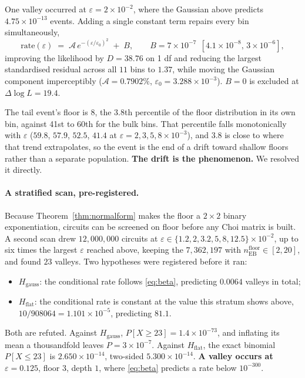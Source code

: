 \documentclass[11pt,a4paper]{article}
\theoremstyle{definition}
\theoremstyle{remark}
\newcommand{\floor}{n_{\mathrm{EB}}^{\mathrm{floor}}}
\begin{document}
One valley occurred at $\varepsilon = 2\times10^{-2}$, where the Gaussian above predicts $4.75\times10^{-13}$ events. Adding a single constant term repairs every bin simultaneously,
\begin{equation}\label{eq:tail}
  \text{rate}(\varepsilon) \;=\; \mathcal{A}\,e^{-(\varepsilon/\varepsilon_0)^2} \;+\; B, \qquad B = 7\times10^{-7}\ \ [4.1\times10^{-8},\, 3\times10^{-6}],
\end{equation}
improving the likelihood by $D = 38.76$ on 1 df and reducing the largest standardised residual across all $11$ bins to $1.37$, while moving the Gaussian component imperceptibly ($\mathcal{A} = 0.7902\%$, $\varepsilon_0 = 3.288\times10^{-3}$). $B = 0$ is excluded at $\Delta\log L = 19.4$.

The tail event's floor is $8$, the $3.8$th percentile of the floor distribution in its own bin, against 41st to 60th for the bulk bins. That percentile falls monotonically with $\varepsilon$ ($59.8$, $57.9$, $52.5$, $41.4$ at $\varepsilon = 2, 3, 5, 8 \times10^{-3}$), and $3.8$ is close to where that trend extrapolates, so the event is the end of a drift toward shallow floors rather than a separate population. \textbf{The drift is the phenomenon.} We resolved it directly.

\paragraph{A stratified scan, pre-registered.} Because Theorem~\ref{thm:normalform} makes the floor a $2\times2$ binary exponentiation, circuits can be screened on floor before any Choi matrix is built. A second scan drew $12{,}000{,}000$ circuits at $\varepsilon \in \{1.2, 2, 3.2, 5, 8, 12.5\}\times10^{-2}$, up to six times the largest $\varepsilon$ reached above, keeping the $7{,}362{,}197$ with $\floor \in [2,20]$, and found $23$ valleys. Two hypotheses were registered before it ran:
\begin{itemize}\itemsep2pt
\item $H_{\mathrm{gauss}}$: the conditional rate follows \eqref{eq:beta}, predicting $0.0064$ valleys in total;
\item $H_{\mathrm{flat}}$: the conditional rate is constant at the value this stratum shows above, $10/908064 = 1.101\times10^{-5}$, predicting $81.1$.
\end{itemize}
Both are refuted. Against $H_{\mathrm{gauss}}$, $P[X \ge 23] = 1.4\times10^{-73}$, and inflating its mean a thousandfold leaves $P = 3\times10^{-7}$. Against $H_{\mathrm{flat}}$, the exact binomial $P[X \le 23]$ is $2.650\times10^{-14}$, two-sided $5.300\times10^{-14}$. \textbf{A valley occurs at $\varepsilon = 0.125$}, floor $3$, depth $1$, where \eqref{eq:beta} predicts a rate below $10^{-300}$.
\end{document}
